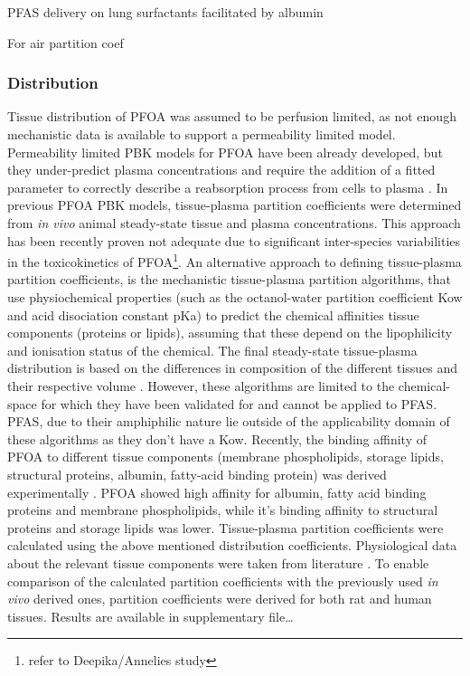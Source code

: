 \documentclass[
  authoryear,
  preprint]{elsarticle}
\begin{document}
PFAS delivery on lung surfactants facilitated by albumin
\citep{forsthuber2020}

For air partition coef \citep{yao2025}

\subsubsection{Distribution}\label{distribution}

Tissue distribution of PFOA was assumed to be perfusion limited, as not
enough mechanistic data is available to support a permeability limited
model. Permeability limited PBK models for PFOA have been already
developed, but they under-predict plasma concentrations and require the
addition of a fitted parameter to correctly describe a reabsorption
process from cells to plasma \citep{lin2023, cheng2017}. In previous
PFOA PBK models, tissue-plasma partition coefficients were determined
from \emph{in vivo} animal steady-state tissue and plasma
concentrations. This approach has been recently proven not adequate due
to significant inter-species variabilities in the toxicokinetics of
PFOA\footnote{refer to Deepika/Annelies study}. An alternative approach
to defining tissue-plasma partition coefficients, is the mechanistic
tissue-plasma partition algorithms, that use physiochemical properties
(such as the octanol-water partition coefficient Kow and acid
disociation constant pKa) to predict the chemical affinities tissue
components (proteins or lipids), assuming that these depend on the
lipophilicity and ionisation status of the chemical. The final
steady-state tissue-plasma distribution is based on the differences in
composition of the different tissues and their respective volume
\citep{Rodgers2007, Utsey2020b, Peyret2010}. However, these algorithms
are limited to the chemical-space for which they have been validated for
and cannot be applied to PFAS. PFAS, due to their amphiphilic nature lie
outside of the applicability domain of these algorithms as they don't
have a Kow. Recently, the binding affinity of PFOA to different tissue
components (membrane phospholipids, storage lipids, structural proteins,
albumin, fatty-acid binding protein) was derived experimentally
\citep{allendorf2020}. PFOA showed high affinity for albumin, fatty acid
binding proteins and membrane phospholipids, while it's binding affinity
to structural proteins and storage lipids was lower. Tissue-plasma
partition coefficients were calculated using the above mentioned
distribution coefficients. Physiological data about the relevant tissue
components were taken from literature \citep{allendorf2020, utsey2020}.
To enable comparison of the calculated partition coefficients with the
previously used \emph{in vivo} derived ones, partition coefficients were
derived for both rat and human tissues. Results are available in
supplementary file\ldots{}
\end{document}
